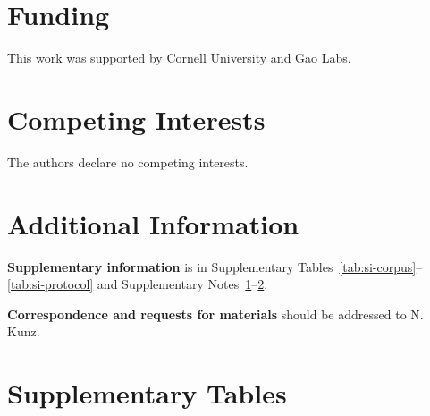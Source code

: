 \documentclass{article}
\begin{document}
\section*{Funding}
\label{sec:funding}
This work was supported by Cornell University and Gao Labs.

\section*{Competing Interests}
\label{sec:competing}
The authors declare no competing interests.

\section*{Additional Information}
\label{sec:additional}
\textbf{Supplementary information} is in Supplementary Tables~\ref{tab:si-corpus}--\ref{tab:si-protocol} and Supplementary Notes~\hyperref[sec:si-note-bipartite]{1}--\hyperref[sec:si-note-processing]{2}.

\textbf{Correspondence and requests for materials} should be addressed to N. Kunz.

\newpage



\clearpage
\begingroup
\renewcommand{\tablename}{Supplementary Table}
\renewcommand{\theHtable}{supp.\arabic{table}}
\setcounter{table}{0}
\captionsetup[table]{font=footnotesize,labelfont=bf,labelsep=period,justification=raggedright,singlelinecheck=false}
\setlength{\tabcolsep}{3pt}
\renewcommand{\arraystretch}{1.15}
\footnotesize

\section*{Supplementary Tables}
\begingroup
\captionsetup{hypcap=false}
\label{tab:si-corpus}
\endgroup
\end{document}
